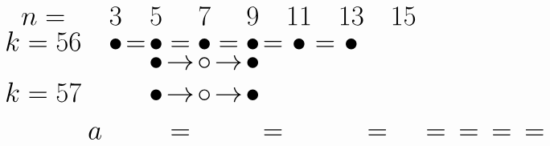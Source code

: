\documentclass{article}
\begin{document}
\(
\begin{tikzcd}[nodes={font=\Huge,inner sep=0pt},row sep=0.2cm,column sep=0.1cm]
n=&&  && 3 && 5 && 7 && 9 && 11 && 13 && 15 \\
k=56 && && \bullet &=& \bullet &=& \bullet &=& \bullet &=& \bullet &=& \bullet \\
&& && && \bullet &\rightarrow& \circ &\rightarrow& \bullet \\ \\
k=57 && && && \bullet &\rightarrow& \circ &\rightarrow& \bullet \\ \\ \\ \\
&& a&& && &=& && &=&  && &=&  && &=&  && &=&  && &=&  && &=&  
\end{tikzcd}
\) \\
\end{document}
